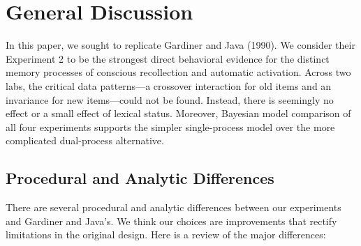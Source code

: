 \documentclass[english,,man,floatsintext]{apa6}
\begin{document}
\hypertarget{general-discussion}{%
\section{General Discussion}\label{general-discussion}}

In this paper, we sought to replicate Gardiner and Java (1990). We consider their Experiment 2 to be the strongest direct behavioral evidence for the distinct memory processes of conscious recollection and automatic activation.
Across two labs, the critical data patterns---a crossover interaction for old items and an invariance for new items---could not be found. Instead, there is seemingly no effect or a small effect of lexical status. Moreover, Bayesian model comparison of all four experiments supports the simpler single-process model over the more complicated dual-process alternative.

\hypertarget{procedural-and-analytic-differences}{%
\subsection{Procedural and Analytic Differences}\label{procedural-and-analytic-differences}}

There are several procedural and analytic differences between our experiments and Gardiner and Java's. We think our choices are improvements that rectify limitations in the original design. Here is a review of the major differences:
\end{document}
